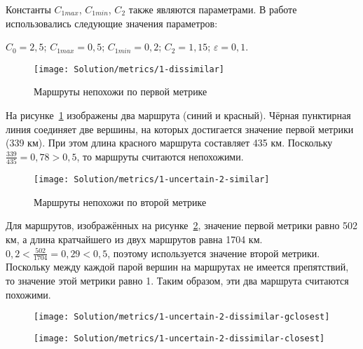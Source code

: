 Константы $C_{1max}$, $C_{1min}$, $C_2$ также являются параметрами. В
работе использовались следующие значения параметров:

$C_0 = 2,5$; $C_{1max} = 0,5$; $C_{1min} = 0,2$; $C_2 = 1,15$;
$\varepsilon = 0,1$.

\begin{figure}
    \texttt{[image: Solution/metrics/1-dissimilar]}
    \caption{Маршруты непохожи по первой метрике}
    \label{fig:1-dissimilar}
\end{figure}

На рисунке~\ref{fig:1-dissimilar} изображены два маршрута (синий и
красный). Чёрная пунктирная линия соединяет две вершины, на которых
достигается значение первой метрики (339 км). При этом длина красного
маршрута составляет 435 км. Поскольку $\frac{339}{435} = 0,78 > 0,5$,
то маршруты считаются непохожими.

\begin{figure}
    \texttt{[image: Solution/metrics/1-uncertain-2-similar]}
    \caption{Маршруты непохожи по второй метрике}
    \label{fig:1-uncertain-2-similar}
\end{figure}

Для маршрутов, изображённых на
рисунке~\ref{fig:1-uncertain-2-similar}, значение первой метрики равно
502 км, а длина кратчайшего из двух маршрутов равна 1704 км. $0,2 <
\frac{502}{1704} = 0,29 < 0,5$, поэтому используется значение второй метрики.
Поскольку между каждой парой вершин на маршрутах не имеется
препятствий, то значение этой метрики равно 1. Таким образом, эти два
маршрута считаются похожими.

\begin{figure}
    \centering
    \begin{minipage}{.5\textwidth}
        \centering
        \texttt{[image: Solution/metrics/1-uncertain-2-dissimilar-gclosest]}
        \label{fig:1-uncertain-2-dissimilar-gclosest}
    \end{minipage}%
    \begin{minipage}{.5\textwidth}
        \centering
        \texttt{[image: Solution/metrics/1-uncertain-2-dissimilar-closest]}
        \label{fig:1-uncertain-2-dissimilar-closest}
    \end{minipage}
\end{figure}

